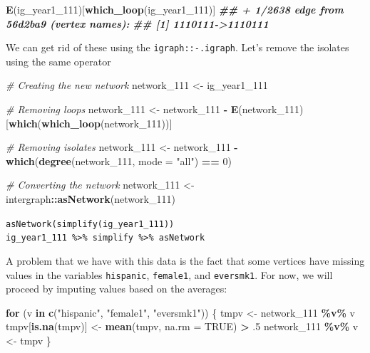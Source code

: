 \documentclass[
]{book}
\newenvironment{Shaded}{\begin{snugshade}}{\end{snugshade}}
\newcommand{\AttributeTok}[1]{\textcolor[rgb]{0.13,0.29,0.53}{#1}}
\newcommand{\CommentTok}[1]{\textcolor[rgb]{0.56,0.35,0.01}{\textit{#1}}}
\newcommand{\ConstantTok}[1]{\textcolor[rgb]{0.56,0.35,0.01}{#1}}
\newcommand{\ControlFlowTok}[1]{\textcolor[rgb]{0.13,0.29,0.53}{\textbf{#1}}}
\newcommand{\DecValTok}[1]{\textcolor[rgb]{0.00,0.00,0.81}{#1}}
\newcommand{\DocumentationTok}[1]{\textcolor[rgb]{0.56,0.35,0.01}{\textbf{\textit{#1}}}}
\newcommand{\FunctionTok}[1]{\textcolor[rgb]{0.13,0.29,0.53}{\textbf{#1}}}
\newcommand{\NormalTok}[1]{#1}
\newcommand{\OtherTok}[1]{\textcolor[rgb]{0.56,0.35,0.01}{#1}}
\newcommand{\SpecialCharTok}[1]{\textcolor[rgb]{0.81,0.36,0.00}{\textbf{#1}}}
\newcommand{\StringTok}[1]{\textcolor[rgb]{0.31,0.60,0.02}{#1}}
\begin{document}
\begin{Shaded}
\begin{Highlighting}[]
\FunctionTok{E}\NormalTok{(ig\_year1\_111)[}\FunctionTok{which\_loop}\NormalTok{(ig\_year1\_111)]}
\DocumentationTok{\#\# + 1/2638 edge from 56d2ba9 (vertex names):}
\DocumentationTok{\#\# [1] 1110111{-}\textgreater{}1110111}
\end{Highlighting}
\end{Shaded}

We can get rid of these using the \texttt{igraph::-.igraph}. Let's remove the isolates using the same operator

\begin{Shaded}
\begin{Highlighting}[]
\CommentTok{\# Creating the new network}
\NormalTok{network\_111 }\OtherTok{\textless{}{-}}\NormalTok{ ig\_year1\_111}

\CommentTok{\# Removing loops}
\NormalTok{network\_111 }\OtherTok{\textless{}{-}}\NormalTok{ network\_111 }\SpecialCharTok{{-}} \FunctionTok{E}\NormalTok{(network\_111)[}\FunctionTok{which}\NormalTok{(}\FunctionTok{which\_loop}\NormalTok{(network\_111))]}

\CommentTok{\# Removing isolates}
\NormalTok{network\_111 }\OtherTok{\textless{}{-}}\NormalTok{ network\_111 }\SpecialCharTok{{-}} \FunctionTok{which}\NormalTok{(}\FunctionTok{degree}\NormalTok{(network\_111, }\AttributeTok{mode =} \StringTok{"all"}\NormalTok{) }\SpecialCharTok{==} \DecValTok{0}\NormalTok{)}

\CommentTok{\# Converting the network}
\NormalTok{network\_111 }\OtherTok{\textless{}{-}}\NormalTok{ intergraph}\SpecialCharTok{::}\FunctionTok{asNetwork}\NormalTok{(network\_111)}
\end{Highlighting}
\end{Shaded}

\texttt{asNetwork(simplify(ig\_year1\_111))}
\texttt{ig\_year1\_111\ \%\textgreater{}\%\ simplify\ \%\textgreater{}\%\ asNetwork}

A problem that we have with this data is the fact that some vertices have missing values in the variables \texttt{hispanic}, \texttt{female1}, and \texttt{eversmk1}. For now, we will proceed by imputing values based on the averages:

\begin{Shaded}
\begin{Highlighting}[]
\ControlFlowTok{for}\NormalTok{ (v }\ControlFlowTok{in} \FunctionTok{c}\NormalTok{(}\StringTok{"hispanic"}\NormalTok{, }\StringTok{"female1"}\NormalTok{, }\StringTok{"eversmk1"}\NormalTok{)) \{}
\NormalTok{  tmpv }\OtherTok{\textless{}{-}}\NormalTok{ network\_111 }\SpecialCharTok{\%v\%}\NormalTok{ v}
\NormalTok{  tmpv[}\FunctionTok{is.na}\NormalTok{(tmpv)] }\OtherTok{\textless{}{-}} \FunctionTok{mean}\NormalTok{(tmpv, }\AttributeTok{na.rm =} \ConstantTok{TRUE}\NormalTok{) }\SpecialCharTok{\textgreater{}}\NormalTok{ .}\DecValTok{5}
\NormalTok{  network\_111 }\SpecialCharTok{\%v\%}\NormalTok{ v }\OtherTok{\textless{}{-}}\NormalTok{ tmpv}
\NormalTok{\}}
\end{Highlighting}
\end{Shaded}
\end{document}

